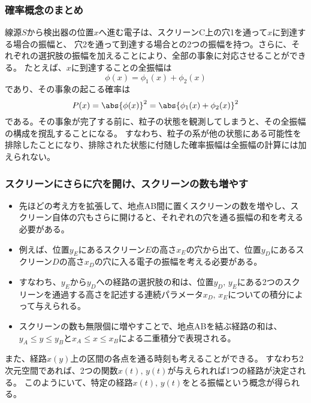 \documentclass[11pt,aspectratio=169,xcolor=dvipsnames,table,dvipdfmx]{beamer}
\begin{document}
\begin{frame}
  \frametitle{確率概念のまとめ}
  線源$S$から検出器の位置$x$へ進む電子は、スクリーンC上の穴1を通って$x$に到達する場合の振幅と、
  穴2を通って到達する場合との2つの振幅を持つ。さらに、それぞれの選択肢の振幅を加えることにより、全部の事象に対応させることができる。
  たとえば、$x$に到達することの全振幅は
  \begin{equation}
    \phi(x) = \phi_1(x) + \phi_2(x)
  \end{equation}
  であり、その事象の起こる確率は
  \begin{equation}
    P(x) = \abs{\phi(x)}^2 = \abs{\phi_1(x)+\phi_2(x)}^2
  \end{equation}
  である。その事象が完了する前に、粒子の状態を観測してしまうと、その全振幅の構成を撹乱することになる。
  すなわち、粒子の系が他の状態にある可能性を排除したことになり、排除された状態に付随した確率振幅は全振幅の計算には加えられない。
\end{frame}
\begin{frame}
  \frametitle{スクリーンにさらに穴を開け、スクリーンの数も増やす}
  \begin{itemize}
    \item 先ほどの考え方を拡張して、地点AB間に置くスクリーンの数を増やし、スクリーン自体の穴もさらに開けると、それぞれの穴を通る振幅の和を考える必要がある。
    \item 例えば、位置$y_E$にあるスクリーン$E$の高さ$x_E$の穴から出て、位置$y_D$にあるスクリーン$D$の高さ$x_D$の穴に入る電子の振幅を考える必要がある。
    \item すなわち、$y_E$から$y_D$への経路の選択肢の和は、位置$y_D,\,y_E$にある2つのスクリーンを通過する高さを記述する連続パラメータ$x_D,\,x_E$についての積分によって与えられる。
    \item スクリーンの数も無限個に増やすことで、地点ABを結ぶ経路の和は、$y_A\leq y\leq y_B$と$x_A\leq x\leq x_B$による二重積分で表現される。
  \end{itemize}
  また、経路$x(y)$上の区間の各点を通る時刻も考えることができる。
  すなわち2次元空間であれば、2つの関数$x(t),\,y(t)$が与えられれば1つの経路が決定される。
  このようにいて、特定の経路$x(t),\,y(t)$をとる振幅という概念が得られる。
\end{frame}

\end{document}
